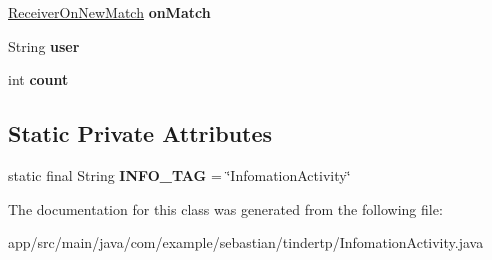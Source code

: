 \begin{DoxyCompactItemize}
\item 
\hyperlink{classcom_1_1example_1_1sebastian_1_1tindertp_1_1services_1_1ReceiverOnNewMatch}{Receiver\+On\+New\+Match} {\bfseries on\+Match}\hypertarget{classcom_1_1example_1_1sebastian_1_1tindertp_1_1InfomationActivity_abb5e767c612ad2c32f40990397362e2f}{}\label{classcom_1_1example_1_1sebastian_1_1tindertp_1_1InfomationActivity_abb5e767c612ad2c32f40990397362e2f}

\item 
String {\bfseries user}\hypertarget{classcom_1_1example_1_1sebastian_1_1tindertp_1_1InfomationActivity_a4d343667622b3b4c047c0ae73ae34c2b}{}\label{classcom_1_1example_1_1sebastian_1_1tindertp_1_1InfomationActivity_a4d343667622b3b4c047c0ae73ae34c2b}

\item 
int {\bfseries count}\hypertarget{classcom_1_1example_1_1sebastian_1_1tindertp_1_1InfomationActivity_a1eec4e3f89140ccd56dda5273a06533d}{}\label{classcom_1_1example_1_1sebastian_1_1tindertp_1_1InfomationActivity_a1eec4e3f89140ccd56dda5273a06533d}

\end{DoxyCompactItemize}
\subsection*{Static Private Attributes}
\begin{DoxyCompactItemize}
\item 
static final String {\bfseries I\+N\+F\+O\+\_\+\+T\+AG} = \char`\"{}Infomation\+Activity\char`\"{}\hypertarget{classcom_1_1example_1_1sebastian_1_1tindertp_1_1InfomationActivity_a9a5ef5f4bbc2ab28e9a2dd79060579a8}{}\label{classcom_1_1example_1_1sebastian_1_1tindertp_1_1InfomationActivity_a9a5ef5f4bbc2ab28e9a2dd79060579a8}

\end{DoxyCompactItemize}


The documentation for this class was generated from the following file\+:\begin{DoxyCompactItemize}
\item 
app/src/main/java/com/example/sebastian/tindertp/Infomation\+Activity.\+java\end{DoxyCompactItemize}
